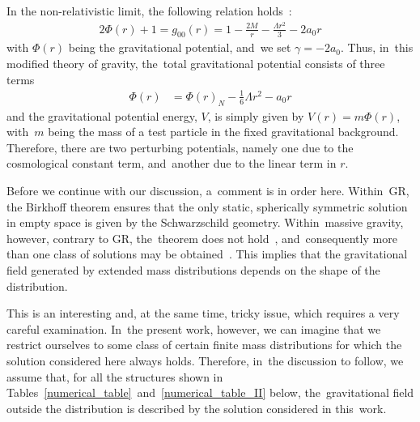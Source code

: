 \documentclass[aps,amsmath,amssymb,twocolumn]{revtex4}
\begin{document}
In the non-relativistic limit, the following relation holds~\cite{landau,Wald:1984rg}:
%
\begin{align}
2 \Phi(r) + 1 = g_{00}(r) = 1-\frac{2M}{r}-\frac{\Lambda r^2}{3} - 2a_0 r
\end{align}
%
with $\Phi(r)$ being the gravitational potential, and~we  set $\gamma = -2 a_0$. Thus, in~this modified 
theory of gravity, the~total gravitational potential consists of three terms
%
\begin{align}
\Phi(r) &= \Phi(r)_N  - \frac{1}{6}\Lambda r^2 - a_0 r
\end{align}
%
and the gravitational potential energy, $V$, is simply given by $V(r) = m \Phi(r)$, with~$m$ being the mass of a test particle in the fixed gravitational background. Therefore, there are two perturbing potentials, namely one due to the cosmological constant term, and~another due to the linear term in $r$.

Before we continue with our discussion, a~comment is in order here. Within~GR, the Birkhoff theorem ensures that the only static, spherically symmetric solution in empty space is given by the Schwarzschild geometry. Within~massive gravity, however, contrary to GR, the~theorem does not hold~\cite{Jafari:2017ypl}, and~consequently more than one class of solutions may be obtained~\cite{Jafari:2017ypl,Li:2016fbf,Koyama:2011xz,Koyama:2011yg}. This implies that the gravitational field generated by extended mass distributions depends on the shape of the distribution. 

This is an interesting and, at the same time, tricky issue, which requires a very careful examination. In~the present work, however, we can imagine that we restrict ourselves to some class of certain finite mass distributions for which the solution considered here always holds. Therefore, in~the discussion to follow, we  assume that, for all the structures shown in \mbox{Tables \ref{numerical_table} and \ref{numerical_table_II}}  below, the~gravitational field outside the distribution is described by the solution considered in this~work.


\end{document}
